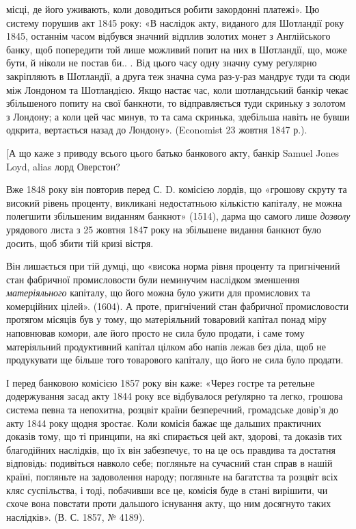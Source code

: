 \parcont{}  %
місці, де його уживають, коли доводиться робити закордонні платежі». Цю систему
порушив акт 1845 року: «В наслідок акту, виданого для Шотландії
року 1845, останнім часом відбувся значний відплив золотих монет з Англійського
банку, щоб попередити той лише можливий попит на них в Шотландії,
що, може бути, й ніколи не постав би.. . Від цього часу одну значну суму
реґулярно закріпляють в Шотландії, а друга теж значна сума раз-у-раз мандрує
туди та сюди між Лондоном та Шотландією. Якщо настає час, коли шотландський
банкір чекає збільшеного попиту на свої банкноти, то відправляється
туди скриньку з золотом з Лондону; а коли цей час минув, то та сама скринька,
здебільша навіть не бувши одкрита, вертається назад до Лондону». (Economist
23 жовтня 1847 р.).

[А що каже з приводу всього цього батько банкового акту, банкір Samuel
Jones Loyd, alias лорд Оверстон?

Вже 1848 року він повторив перед С. D. комісією лордів, що «грошову
скруту та високий рівень проценту, викликані недостатньою кількістю капіталу,
не можна полегшити збільшеним виданням банкнот» (1514), дарма що
самого лише \emph{дозволу} урядового листа з 25 жовтня 1847 року на збільшене
видання банкнот було досить, щоб збити тій кризі вістря.

Він лишається при тій думці, що «висока норма рівня проценту та пригнічений
стан фабричної промисловости були неминучим наслідком зменшення
\emph{матеріяльного} капіталу, що його можна було ужити для промислових та комерційних
цілей». (1604). А проте, пригнічений стан фабричної промисловости
протягом місяців був у тому, що матеріяльний товаровий капітал понад міру
наповнював комори, але його просто не сила було продати, і саме тому матеріяльний
продуктивний капітал цілком або напів лежав без діла, щоб не продукувати
ще більше того товарового капіталу, що його не сила було продати.

І перед банковою комісією 1857 року він каже: «Через гостре та ретельне
додержування засад акту 1844 року все відбувалося реґулярно та легко, грошова
система певна та непохитна, розцвіт країни безперечний, громадське довір’я
до акту 1844 року щодня зростає. Коли комісія бажає ще дальших
практичних доказів тому, що ті принципи, на які спирається цей акт, здорові,
та доказів тих благодійних наслідків, що їх він забезпечує, то на це ось правдива
та достатня відповідь: подивіться навколо себе; погляньте на сучасний
стан справ в нашій країні, погляньте на задоволення народу; погляньте на
багатства та розцвіт всіх кляс суспільства, і тоді, побачивши все це, комісія
буде в стані вирішити, чи схоче вона повстати проти дальшого існування акту,
що ним досягнуто таких наслідків». (В. С. 1857, № 4189).

